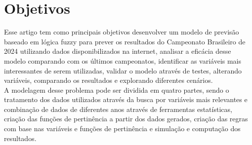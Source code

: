 \documentclass[conference]{IEEEtran}
\begin{document}
\section{Objetivos}
\indent Esse artigo tem como principais objetivos desenvolver um modelo de 
previsão baseado em lógica fuzzy para prever os resultados do Campeonato 
Brasileiro de 2024 utilizando dados disponibilizados na internet, analisar a 
eficácia desse modelo comparando com os últimos campeonatos, identificar as 
variáveis mais interessantes de serem utilizadas, validar o modelo através de 
testes, alterando variáveis, comparando os resultados e explorando diferentes 
cenários.\\
\indent A modelagem desse problema pode ser dividida em quatro partes, sendo o 
tratamento dos dados utilizados através da busca por variáveis mais 
relevantes e combinação de dados de diferentes anos através de ferramentas 
estatísticas, criação das funções de pertinência a partir dos dados gerados, 
criação das regras com base nas variáveis e funções de pertinência e simulação 
e computação dos resultados.
\end{document}
